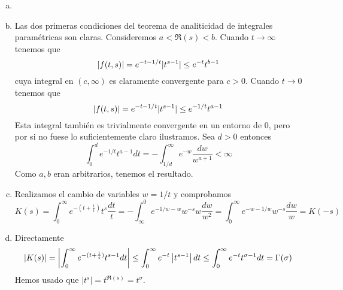 \documentclass[twoside]{article}
\begin{document}
\begin{solucion}
\begin{enumerate}[a)]
\item[]
\item Las dos primeras condiciones del teorema de analiticidad de integrales paramétricas son claras. Consideremos $a<\Re(s)<b$. Cuando $t\to \infty$ tenemos que
$$
\left\lvert f(t,s)\right\rvert = e^{-t -1/t}|t^{s-1}| \leq e^{-t}t^{b-1}
$$
cuya integral en $(c,\infty)$ es claramente convergente para $c>0$. Cuando $t\to 0$ tenemos que
$$
\left\lvert f(t,s)\right\rvert = e^{-t-1/t}|t^{s-1}| \leq e^{-1/t}t^{a-1}
$$
Esta integral también es trivialmente convergente en un entorno de 0, pero por si no fuese lo suficientemente claro ilustramos. Sea $d>0$ entonces
$$
\int_0^d e^{-1/t}t^{a-1} dt = -\int_{1/d}^\infty e^{-w}\frac{dw}{w^{a+1}}<\infty
$$
Como $a,b$ eran arbitrarios, tenemos el resultado.
\item Realizamos el cambio de variables $w=1/t$ y comprobamos
$$
K(s) =\int_0^\infty e^{-(t+\frac{1}{t})}t^s\frac{dt}{t} = - \int_\infty^0 e^{-1/w-w}w^{-s}w \frac{dw}{w^2} = \int_0^\infty e^{-w-1/w}w^{-s}\frac{dw}{w} = K(-s)
$$
\item Directamente
$$
|K(s)| = \left\lvert\int_0^\infty e^{-(t+\frac{1}{t})}t^{s-1}dt\right\rvert\leq \int_0^\infty e^{-t}\left\lvert t^{s-1}\right\rvert dt \leq \int_0^\infty e^{-t}{t^{\sigma-1}}dt = \Gamma(\sigma)
$$
Hemos usado que $|t^{s}| = t^{\Re(s)} = t^\sigma$.
\end{enumerate}
\end{solucion}
\newpage
\end{document}
